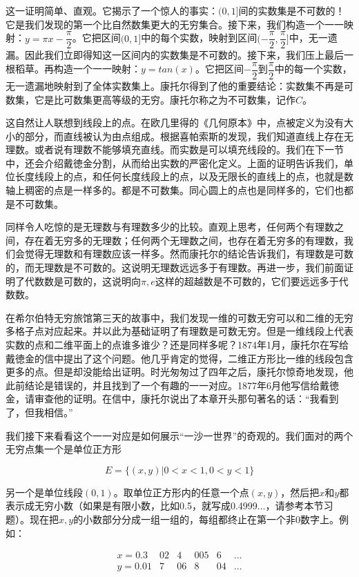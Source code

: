 \documentclass{article}
\begin{document}
这一证明简单、直观。它揭示了一个惊人的事实：$(0, 1]$间的实数集是不可数的！它是我们发现的第一个比自然数集更大的无穷集合。接下来，我们构造一个一一映射：$y = \pi x - \dfrac{\pi}{2}$。它把区间$(0, 1]$中的每个实数，映射到区间$(-\dfrac{\pi}{2}, \dfrac{\pi}{2}]$中，无一遗漏。因此我们立即得知这一区间内的实数集是不可数的。接下来，我们压上最后一根稻草。再构造一个一一映射：$ y = tan(x)$。它把区间$-\dfrac{\pi}{2}$到$\dfrac{\pi}{2}$中的每一个实数，无一遗漏地映射到了全体实数集上。康托尔得到了他的重要结论：实数集不再是可数集，它是比可数集更高等级的无穷。康托尔称之为不可数集，记作$C$。

这自然让人联想到线段上的点。在欧几里得的《几何原本》中，点被定义为没有大小的部分，而直线被认为由点组成。根据喜帕索斯的发现，我们知道直线上存在无理数。或者说有理数不能够填充直线。而实数是可以填充线段的。我们在下一节中，还会介绍戴徳金分割，从而给出实数的严密化定义。上面的证明告诉我们，单位长度线段上的点，和任何长度线段上的点，以及无限长的直线上的点，也就是数轴上稠密的点是一样多的。都是不可数集。同心圆上的点也是同样多的，它们也都是不可数集。

同样令人吃惊的是无理数与有理数多少的比较。直观上思考，任何两个有理数之间，存在着无穷多的无理数；任何两个无理数之间，也存在着无穷多的有理数，我们会觉得无理数和有理数应该一样多。然而康托尔的结论告诉我们，有理数是可数的，而无理数是不可数的。这说明无理数远远多于有理数。再进一步，我们前面证明了代数数是可数的，这说明向$\pi, e$这样的超越数是不可数的，它们要远远多于代数数。

在希尔伯特无穷旅馆第三天的故事中，我们发现一维的可数无穷可以和二维的无穷多格子点对应起来。并以此为基础证明了有理数是可数无穷。但是一维线段上代表实数的点和二维平面上的点谁多谁少？还是同样多呢？1874年1月，康托尔在写给戴徳金的信中提出了这个问题。他几乎肯定的觉得，二维正方形比一维的线段包含更多的点。但是却没能给出证明。时光匆匆过了四年之后，康托尔惊奇地发现，他此前结论是错误的，并且找到了一个有趣的一一对应。1877年6月他写信给戴徳金，请审查他的证明。在信中，康托尔说出了本章开头那句著名的话：“我看到了，但我相信。”

我们接下来看看这个一一对应是如何展示“一沙一世界”的奇观的。我们面对的两个无穷点集一个是单位正方形

\[
E = \{ (x, y) | 0 < x < 1, 0 < y < 1\}
\]

另一个是单位线段$(0, 1)$。取单位正方形内的任意一个点$(x, y)$，然后把$x$和$y$都表示成无穷小数（如果是有限小数，比如0.5，就写成0.4999...，请参考本节习题）。现在把$x, y$的小数部分分成一组一组的，每组都终止在第一个非0数字上。例如：

\[
\begin{array}{lcccccc}
x = 0.3 & 02 & 4 & 005 & 6 & ... \\
y = 0.01 & 7 & 06 & 8 & 04 & ... \\
\end{array}
\]
\end{document}
